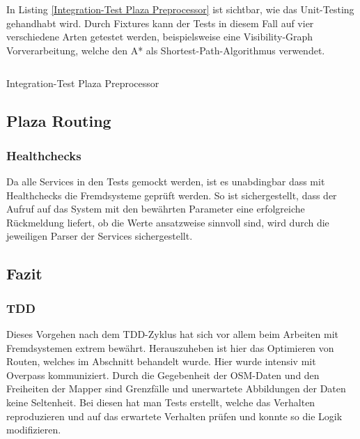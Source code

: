 In Listing \ref{Integration-Test Plaza Preprocessor} ist sichtbar, wie das Unit-Testing gehandhabt wird. Durch Fixtures kann der Tests in diesem Fall auf vier verschiedene Arten getestet werden, beispielsweise eine Visibility-Graph Vorverarbeitung, welche den A* \cite{astar} als Shortest-Path-Algorithmus verwendet.

\begin{listing}[ht]
    \inputminted{python}{projectdoc/listing/test_plaza_prepreprocessor.py}
    \caption{Integration-Test Plaza Preprocessor}
    \label{Integration-Test Plaza Preprocessor}
\end{listing}

\subsection{Plaza Routing}
\label{test:Plaza Routing}


\subsubsection{Healthchecks}
\label{test:Healthchecks}
Da alle Services in den Tests gemockt werden, ist es unabdingbar dass mit Healthchecks die Fremdsysteme geprüft werden. So ist sichergestellt, dass der Aufruf auf das System mit den bewährten Parameter eine erfolgreiche Rückmeldung liefert, ob die Werte ansatzweise sinnvoll sind, wird durch die jeweiligen Parser der Services sichergestellt.



\subsection{Fazit}
\label{test:Fazit}

\subsubsection{TDD}
\label{fazit:TDD}
Dieses Vorgehen nach dem \ac{TDD}-Zyklus hat sich vor allem beim Arbeiten mit Fremdsystemen extrem bewährt. Herauszuheben ist hier das Optimieren von Routen, welches im Abschnitt  behandelt wurde. Hier wurde intensiv mit Overpass \cite{wiki:overpass} kommuniziert. Durch die Gegebenheit der \ac{OSM}-Daten und den Freiheiten der Mapper sind Grenzfälle und unerwartete Abbildungen der Daten keine Seltenheit. Bei diesen hat man Tests erstellt, welche das Verhalten reproduzieren und auf das erwartete Verhalten prüfen und konnte so die Logik modifizieren.

